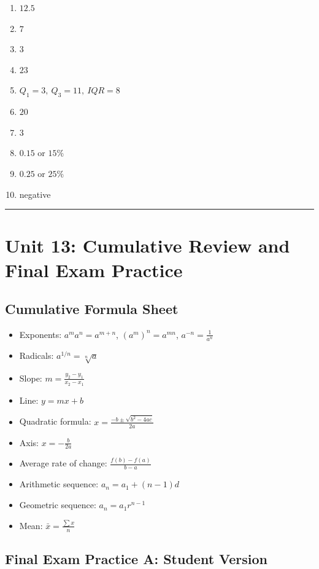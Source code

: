 \documentclass[11pt]{book}
\begin{document}
\begin{enumerate}
\item \(12.5\)
\item \(7\)
\item \(3\)
\item \(23\)
\item \(Q_1=3,\ Q_3=11,\ IQR=8\)
\item \(20\)
\item \(3\)
\item \(0.15\) or \(15\%\)
\item \(0.25\) or \(25\%\)
\item negative
\end{enumerate}

\bigskip\hrule\bigskip

\chapter{Unit 13: Cumulative Review and Final Exam Practice}

\section{Cumulative Formula Sheet}

\begin{itemize}
\item Exponents: \(a^ma^n=a^{m+n}\), \((a^m)^n=a^{mn}\), \(a^{-n}=\frac1{a^n}\)
\item Radicals: \(a^{1/n}=\sqrt[n]a\)
\item Slope: \(m=\frac{y_2-y_1}{x_2-x_1}\)
\item Line: \(y=mx+b\)
\item Quadratic formula: \(x=\frac{-b\pm\sqrt{b^2-4ac}}{2a}\)
\item Axis: \(x=-\frac b{2a}\)
\item Average rate of change: \(\frac{f(b)-f(a)}{b-a}\)
\item Arithmetic sequence: \(a_n=a_1+(n-1)d\)
\item Geometric sequence: \(a_n=a_1r^{n-1}\)
\item Mean: \(\bar{x}=\frac{\sum x}{n}\)
\end{itemize}

\section{Final Exam Practice A: Student Version}
\end{document}
